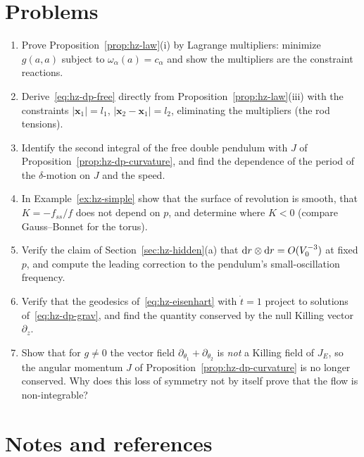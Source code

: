 \section*{Problems}

\begin{enumerate}[label=\textbf{\thechapter.\arabic*}.]
  \item Prove Proposition~\ref{prop:hz-law}(i) by Lagrange multipliers: minimize
        $g(a,a)$ subject to $\omega_\alpha(a)=c_\alpha$ and show the multipliers
        are the constraint reactions.
  \item Derive~\eqref{eq:hz-dp-free} directly from Proposition~\ref{prop:hz-law}(iii) with
        the constraints $|\mathbf x_1|=l_1$, $|\mathbf x_2-\mathbf x_1|=l_2$, eliminating the
        multipliers (the rod tensions).
  \item Identify the second integral of the free double pendulum with
        $J$ of Proposition~\ref{prop:hz-dp-curvature}, and find the dependence of the
        period of the $\delta$-motion on $J$ and the speed.
  \item In Example~\ref{ex:hz-simple} show that the surface of revolution is
        smooth, that $K=-f_{ss}/f$ does not depend on $p$, and determine where $K<0$
        (compare Gauss--Bonnet for the torus).
  \item Verify the claim of Section~\ref{sec:hz-hidden}(a) that $\mathrm{d} r\otimes\mathrm{d} r=O(V_0^{-3})$
        at fixed $p$, and compute the leading correction to the pendulum's small-oscillation frequency.
  \item Verify that the geodesics of~\eqref{eq:hz-eisenhart} with $\dot t=1$ project to
        solutions of~\eqref{eq:hz-dp-grav}, and find the quantity conserved by the
        null Killing vector $\partial_z$.
  \item Show that for $g\neq0$ the vector field $\partial_{\theta_1}+\partial_{\theta_2}$ is
        \emph{not} a Killing field of $J_E$, so the angular momentum $J$ of
        Proposition~\ref{prop:hz-dp-curvature} is no longer conserved. Why does this loss of
        symmetry not by itself prove that the flow is non-integrable?
\end{enumerate}

\section*{Notes and references}

